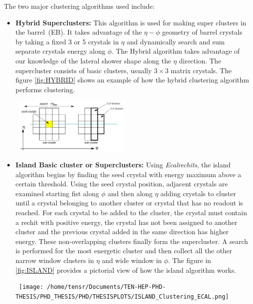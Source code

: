 The two major clustering algorithms used include:
\begin{itemize}
\item \textbf{Hybrid Superclusters:} This algorithm is used for making super clusters in the barrel~(EB). It takes advantage of the $\eta - \phi$ geometry of barrel crystals by taking a fixed 3 or 5 crystals in $\eta$ and dynamically search and sum separate crystals energy along $\phi$. The Hybrid algorithm takes advantage of our knowledge of the lateral shower shape along the $\eta$ direction. The supercluster consists of basic clusters, usually $3\times3$ matrix crystals.
The figure \ref{fig:HYBRID} shows an example of how the hybrid clustering algorithm performs clustering.
\begin{center}
\centering
\mbox{
\includegraphics[height=0.35\textwidth, width=0.45\textwidth]{THESISPLOTS/Hybrid_Clustering_ECAL.png}}
\label{fig:HYBRID}
\end{center}

\item \textbf{Island Basic cluster or Superclusters:} Using \textit{Ecalrechits}, the island algorithm begins by finding the seed crystal with  energy maximum above a certain threshold. Using the seed crystal position, adjacent crystals are examined starting fist along $\phi$ and then along $\eta$ adding crystals to cluster until a crystal belonging to another cluster or crystal that has no readout is reached. For each crystal to be added to the cluster,  the crystal must contain a rechit with positive energy, the crystal has not been assigned to another cluster and the previous crystal added in the same direction has higher energy. These non-overlapping clusters finally form the supercluster. A search is performed for the most energetic cluster and then collect all the other narrow window clusters in $\eta$ and wide window in $\phi$. The figure in \ref{fig:ISLAND} provides a pictorial view of how the island algorithm works.
\begin{center}
\centering
\mbox{
\texttt{[image: /home/tensr/Documents/TEN-HEP-PHD-THESIS/PHD\_THESIS/PHD/THESISPLOTS/ISLAND\_Clustering\_ECAL.png]}
}
 \label{fig:ISLAND}
\end{center}
 
\end{itemize} 

